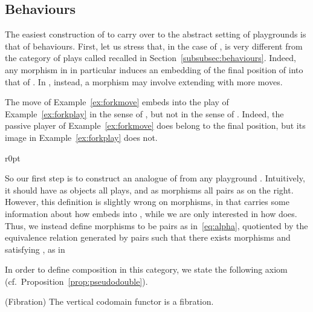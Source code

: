 \documentclass{LMCS}
\theoremstyle{plain}\newtheorem{satz}[thm]{Satz}
\begin{document}
\subsection{Behaviours}\label{subsec:beh}
The easiest construction of  to carry over to the abstract setting
of playgrounds is that of behaviours.  First, let us stress that, in
the case of ,  is very different from the category of
plays called  recalled in Section~\ref{subsubsec:behaviours}.
Indeed, any morphism  in  in
particular induces an embedding of the final position  of
 into that of . In , instead, a morphism  may
involve extending  with more moves.
\begin{exa}
  The move of Example~\ref{ex:forkmove} embeds into the
  play of Example~\ref{ex:forkplay} in the sense of , but not in
  the sense of .  Indeed, the passive player  of
  Example~\ref{ex:forkmove} does belong to the final position, but its
  image in Example~\ref{ex:forkplay} does not.
\end{exa}
\begin{wrapfigure}[6]{r}{0pt}
  \begin{minipage}{0.3\linewidth}
    \centering
    \vspace*{-2em}
    
  \end{minipage}
\end{wrapfigure}
So our first step is to construct an analogue of  from any
playground . Intuitively, it should have as objects all plays, and
as morphisms  all pairs  as on the right.
However, this definition is slightly wrong on morphisms, in that
 carries some information about how  embeds into ,
while we are only interested in how  does.  Thus, we instead define
morphisms  to be pairs  as in~\eqref{eq:alpha},
quotiented by the equivalence relation generated by pairs
 such that there exists morphisms  and
 satisfying , as in
   

   In order to define composition in this category, we state the
   following axiom (cf.\ Proposition~\ref{prop:pseudodouble}).
\begin{ax}
  \begin{myaxioms}[series=myaxiomsseries]
  \item (Fibration) The vertical codomain functor  is a fibration.\label{fibration}
  \end{myaxioms}
\end{ax}
\end{document}
